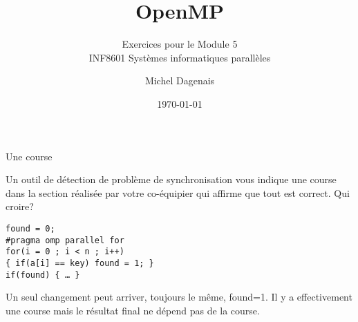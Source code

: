 \documentclass{beamer}
\begin{document}

\setlength{\parskip}{\medskipamount}

\title[]{OpenMP} 
\subtitle{Exercices pour le Module 5 \\
INF8601 Systèmes informatiques parallèles}
\author{Michel Dagenais} 
\date{\today} 

\begin{frame}[plain]
  \titlepage
\end{frame}

\section{}

\begin{frame}[fragile]{Une course}
  \begin{question}
Un outil de détection de problème de synchronisation vous indique une course dans la section réalisée par votre co-équipier qui affirme que tout est correct. Qui croire?
    \begin{verbatim}
found = 0;
#pragma omp parallel for
for(i = 0 ; i < n ; i++) 
{ if(a[i] == key) found = 1; }
if(found) { … }
    \end{verbatim}
  \end{question}
  \begin{answer}
Un seul changement peut arriver, toujours le même, found=1. Il y a effectivement une course mais le résultat final ne dépend pas de la course.
  \end{answer}
\end{frame}
\end{document}
